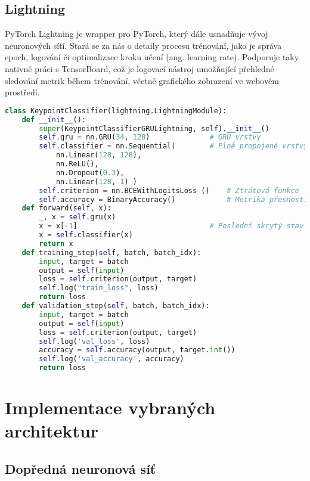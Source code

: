 \subsection{Lightning}
\label{sec:Lightning}

PyTorch Lightning je wrapper pro PyTorch, který dále usnadňuje vývoj
neuronových sítí. Stará se za nás o detaily procesu trénování, jako je správa
epoch, logování či optimalizace kroku učení (ang. learning rate). Podporuje
taky nativně práci s TensorBoard, což je logovací nástroj umožňující přehledné
sledování metrik během trénování, včetně grafického zobrazení ve webovém
prostředí.

\begin{lstlisting}[language=Python, label=src:pytorch, caption={Ukázka implementace GRU sítě v PyTorch Lightning}]
class KeypointClassifier(lightning.LightningModule):
    def __init__():
        super(KeypointClassifierGRULightning, self).__init__()
        self.gru = nn.GRU(34, 128)              # GRU vrstvy
        self.classifier = nn.Sequential(        # Plně propojené vrstvy
            nn.Linear(128, 128),
            nn.ReLU(),
            nn.Dropout(0.3),
            nn.Linear(128, 1) )
        self.criterion = nn.BCEWithLogitsLoss ()    # Ztrátová funkce
        self.accuracy = BinaryAccuracy()            # Metrika přesnosti
    def forward(self, x):
        _, x = self.gru(x)
        x = x[-1]                               # Poslední skrytý stav
        x = self.classifier(x)
        return x
    def training_step(self, batch, batch_idx):
        input, target = batch
        output = self(input)
        loss = self.criterion(output, target)
        self.log("train_loss", loss)
        return loss
    def validation_step(self, batch, batch_idx):
        input, target = batch
        output = self(input)
        loss = self.criterion(output, target)
        self.log('val_loss', loss)
        accuracy = self.accuracy(output, target.int())
        self.log('val_accuracy', accuracy)
        return loss

\end{lstlisting}

\section{Implementace vybraných architektur}
\label{sec:SelectedArchitectures}

\subsection{Dopředná neuronová síť}

